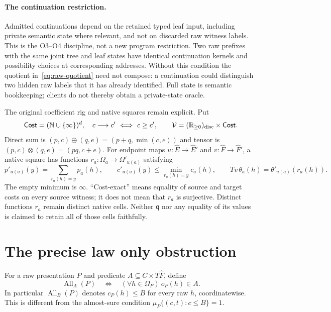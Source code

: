 \documentclass[11pt,a4paper]{article}
\theoremstyle{definition}
\newcommand{\Cost}{\mathsf{Cost}}
\newcommand{\All}{\operatorname{All}}
\newcommand{\qobs}{\mathsf{q}}
\begin{document}
\paragraph{The continuation restriction.}
Admitted continuations depend on the retained typed leaf input, including
private semantic state where relevant, and not on discarded raw witness
labels. This is the O3--O4 discipline, not a new program restriction.
Two raw prefixes with the same joint tree and leaf states have identical
continuation kernels and possibility choices at corresponding addresses.
Without this condition the quotient in~\eqref{eq:raw-quotient} need not
compose: a continuation could distinguish two hidden raw labels that it
has already identified. Full state is semantic bookkeeping; clients do
not thereby obtain a private-state oracle.

The original coefficient rig and native squares remain explicit. Put
\[
 \Cost=(\mathbb N\cup\{\infty\})^d,\quad
 c\longrightarrow c'\ \Longleftrightarrow\ c\geq c',\qquad
 \mathcal V=(\mathbb R_{\geq0})_{\rm disc}\times\Cost.
\]
Direct sum is $(p,c)\oplus(q,e)=(p+q,\min(c,e))$ and tensor is
$(p,c)\otimes(q,e)=(pq,c+e)$. For endpoint maps
$u:\widehat E\to\widehat E'$ and $v:\widehat F\to\widehat F'$, a native
square has functions $r_a:\Omega_a\to\Omega'_{u(a)}$ satisfying
\begin{equation}\label{eq:old-native}
 p'_{u(a)}(y)=\sum_{r_a(h)=y}p_a(h),\qquad
 c'_{u(a)}(y)\leq\min_{r_a(h)=y}c_a(h),\qquad
 Tv\,\theta_a(h)=\theta'_{u(a)}(r_a(h)).
\end{equation}
The empty minimum is $\infty$. ``Cost-exact'' means equality of source
and target costs on every source witness; it does not mean that $r_a$
is surjective. Distinct functions $r_a$ remain distinct native cells.
Neither $\qobs$ nor any equality of its values is claimed to retain all of
those cells faithfully.

\section{The precise law only obstruction}\label{sec:obstruction}
For a raw presentation $P$ and predicate $A\subseteq C\times T\widehat F$,
define
\[
 \All_A(P)\quad\Longleftrightarrow\quad
       (\forall h\in\Omega_P)\ o_P(h)\in A.
\]
In particular $\All_B(P)$ denotes $c_P(h)\leq B$ for every raw $h$,
coordinatewise. This is different from the almost-sure condition
$\mu_P\{(c,t):c\leq B\}=1$.
\end{document}
